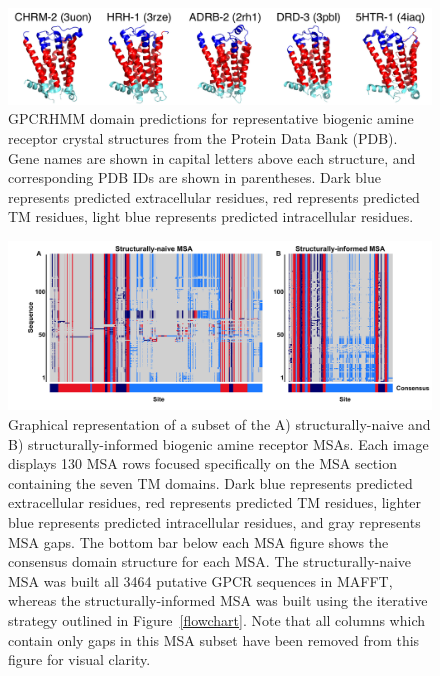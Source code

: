 \documentclass[fleqn,10pt]{wlpeerj}
\begin{document}
\begin{figure}[htbp]
	\centerline{\includegraphics[width=15cm]{figures/pdb_gpcrhmm.pdf}}
	\caption{\label{pdb_gpcrhmm} GPCRHMM domain predictions for representative biogenic amine receptor crystal structures from the Protein Data Bank (PDB). Gene names are shown in capital letters above each structure, and corresponding PDB IDs are shown in parentheses. Dark blue represents predicted extracellular residues, red represents predicted TM residues, light blue represents predicted intracellular residues.}
\end{figure}



\vspace*{2cm}

\begin{figure}[htbp]
	\centerline{\includegraphics[width=8in]{figures/domains_naive_struc.png}}
	\caption{\label{domains} Graphical representation of a subset of the A) structurally-naive and B) structurally-informed biogenic amine receptor MSAs. Each image displays 130 MSA rows focused specifically on the MSA section containing the seven TM domains. Dark blue represents predicted extracellular residues, red represents predicted TM residues, lighter blue represents predicted intracellular residues, and gray represents MSA gaps. The bottom bar below each MSA figure shows the consensus domain structure for each MSA. The structurally-naive MSA was built all 3464 putative GPCR sequences in MAFFT, whereas the structurally-informed MSA was built using the iterative strategy outlined in Figure~\ref{flowchart}. Note that all columns which contain only gaps in this MSA subset have been removed from this figure for visual clarity.}
\end{figure}
\end{document}
